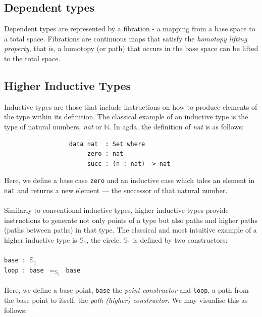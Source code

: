 \documentclass[12pt]{report}
\begin{document}
\subsection*{Dependent types}
Dependent types are represented by a fibration - a mapping from a base space to a total space. Fibrations are continuous maps that satisfy the \textit{homotopy lifting property}, that is, a homotopy (or path) that occurs in the base space can be lifted to the total space.

\subsection*{Higher Inductive Types}
Inductive types are those that include instructions on how to produce elements of the type within its definition. The classical example of an inductive type is the type of natural numbers, \textit{nat} or $\mathbb{N}$. In agda, the definition of \textit{nat} is as follows:\\
\begin{verbatim}
                  data nat  : Set where
                       zero : nat
                       succ : (n : nat) -> nat
\end{verbatim}
Here, we define a base case \texttt{zero} and an inductive case which tales an element in \texttt{nat} and returns a new element --- the successor of that natural number. \\
\\
Similarly to conventional inductive types, higher inductive types provide instructions to generate not only points of a type but also paths and higher paths (paths between paths) in that type. The classical and most intuitive example of a higher inductive type is $\mathbb{S}_1$, the circle. $\mathbb{S}_1$ is defined by two constructors:\\
\\
\-\hspace{4cm}\texttt{base : $\mathbb{S}_1$}\\
\-\hspace{4cm}\texttt{loop : base $=_{\mathbb{S}_1}$ base}
\\
\\
Here, we define a base point, \texttt{base} the \textit{point constructor} and \texttt{loop}, a path from the base point to itself, the \textit{path (higher) constructor}. We may visualise this as follows:
\end{document}
